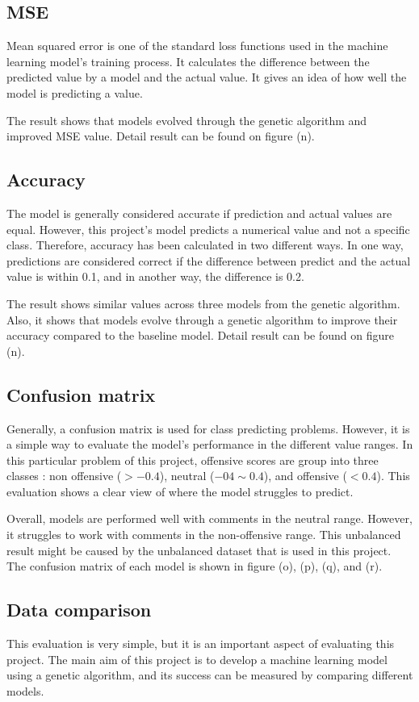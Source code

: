 \documentclass[11pt, natbib=false]{article}
\begin{document}
\subsection{MSE}
Mean squared error is one of the standard loss functions used in the machine learning model's training process.
It calculates the difference between the predicted value by a model and the actual value.
It gives an idea of how well the model is predicting a value.

The result shows that models evolved through the genetic algorithm and improved MSE value.
Detail result can be found on figure (n).

\subsection{Accuracy}
The model is generally considered accurate if prediction and actual values are equal.
However, this project's model predicts a numerical value and not a specific class.
Therefore, accuracy has been calculated in two different ways.
In one way, predictions are considered correct if the difference between predict and the actual value is within 0.1, and in another way, the difference is 0.2.

The result shows similar values across three models from the genetic algorithm.
Also, it shows that models evolve through a genetic algorithm to improve their accuracy compared to the baseline model.
Detail result can be found on figure (n).

\subsection{Confusion matrix}
Generally, a confusion matrix is used for class predicting problems.
However, it is a simple way to evaluate the model’s performance in the different value ranges.
In this particular problem of this project, offensive scores are group into three classes : non offensive ($ > -0.4 $), neutral ($ -04 \sim 0.4 $), and offensive ($ < 0.4 $).
This evaluation shows a clear view of where the model struggles to predict.

Overall, models are performed well with comments in the neutral range.
However, it struggles to work with comments in the non-offensive range.
This unbalanced result might be caused by the unbalanced dataset that is used in this project.
The confusion matrix of each model is shown in figure (o), (p), (q), and (r).

\subsection{Data comparison}
This evaluation is very simple, but it is an important aspect of evaluating this project.
The main aim of this project is to develop a machine learning model using a genetic algorithm, and its success can be measured by comparing different models.
\end{document}
